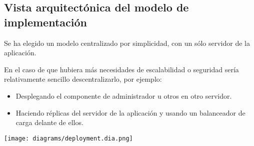 \subsection{Vista arquitectónica del modelo de implementación}

Se ha elegido un modelo centralizado por simplicidad, con un sólo servidor de la
aplicación.

En el caso de que hubiera más necesidades de escalabilidad o seguridad sería
relativamente sencillo descentralizarlo, por ejemplo:

\begin{itemize}
  \item Desplegando el componente de administrador u otros en otro servidor.
  \item Haciendo réplicas del servidor de la aplicación y usando un balanceador
    de carga delante de ellos.
\end{itemize}

\texttt{[image: diagrams/deployment.dia.png]}

